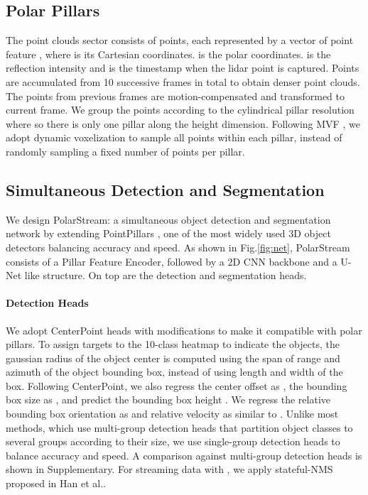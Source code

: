 \documentclass{article}
\begin{document}
\vspace{-2mm}\subsection{Polar Pillars}\label{representation}\vspace{-2mm}
The point clouds sector consists of  points, each represented by a vector of point feature , where  is its Cartesian coordinates.  is the polar coordinates.  is the reflection intensity and  is the timestamp when the lidar point is captured. Points are accumulated from 10 successive frames in total to obtain denser point clouds. The points from previous frames are motion-compensated and transformed to current frame. We group the points according to the cylindrical pillar resolution  where  so there is only one pillar along the height dimension. Following MVF \cite{zhou2019end}, we adopt dynamic voxelization to sample all points within each pillar, instead of randomly sampling a fixed number of points per pillar.

\vspace{-3mm}\subsection{Simultaneous Detection and Segmentation}\label{simultaneous}\vspace{-2mm}
We design PolarStream: a simultaneous object detection and segmentation network by extending PointPillars \cite{lang2019pointpillars}, one of the most widely used 3D object detectors balancing accuracy and speed. As shown in Fig.\ref{fig:net}, PolarStream consists of a Pillar Feature Encoder, followed by a 2D CNN backbone and a U-Net\cite{ronneberger2015u} like structure. On top are the detection and segmentation heads. 

\vspace{-3.5mm}\paragraph{Detection Heads}\label{det} We adopt CenterPoint \cite{yin2020center} heads with modifications to make it compatible with polar pillars. To assign targets to the 10-class heatmap to indicate the objects, the gaussian radius of the object center is computed using the span of range and azimuth of the object bounding box, instead of using length and width of the box. Following CenterPoint, we also regress the center offset as , the bounding box size  as , and predict the bounding box height . We regress the relative bounding box orientation  as  and relative velocity as  similar to \cite{rapoport2020s}. Unlike most methods, which use multi-group detection heads that partition object classes to several groups according to their size, we use single-group detection heads to balance accuracy and speed. A comparison against multi-group detection heads is shown in Supplementary. 
For streaming data with , we apply stateful-NMS proposed in Han et al.\cite{han2020streaming}.
\end{document}
